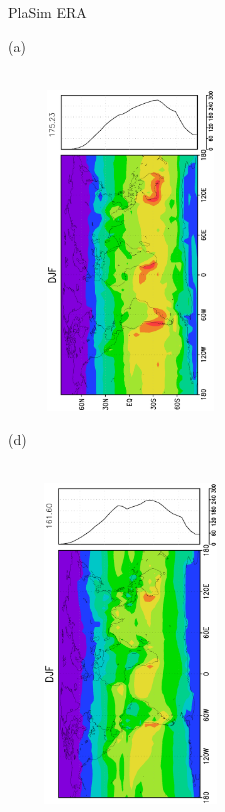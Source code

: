 \documentclass[12pt,a4paper,twoside,openright,headinclude,liststotoc,bibtotoc]{scrreprt}
\begin{document}
\begin{figure}[H]
\hspace{3.0cm}PlaSim \vspace{0.2cm}\hspace{7.2cm} ERA \\
\parbox{8.5cm}{\hspace{0.50cm}\begin{scriptsize}(a)\end{scriptsize} \vspace{-0.7cm} \\
\includegraphics[height=8.5cm,width=6.5cm,angle=-90]
{eps/zonalysmsfcsolrad176DJF.eps}
}
\parbox{8.5cm}{\hspace{0.28cm}\begin{scriptsize}(d)\end{scriptsize} \vspace{-0.7cm} \\
\includegraphics[height=8.5cm,width=6.5cm,angle=-90]
{eps/zonalt21ysmsfcsolradDJF.eps}
}
\end{figure}
\end{document}
